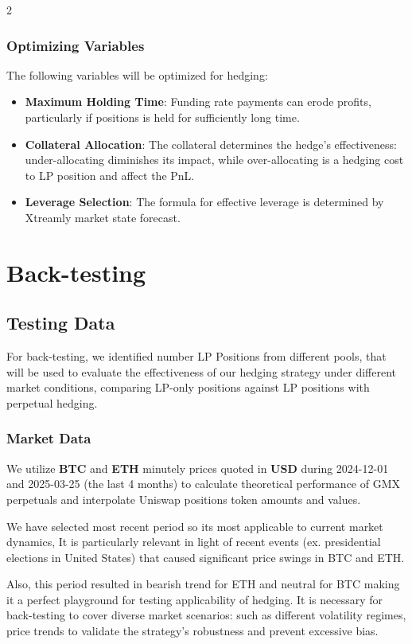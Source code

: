 \documentclass[10pt]{article}
\begin{document}
\begin{multicols}{2}
\subsubsection{Optimizing Variables}
The following variables will be optimized for hedging:
\begin{itemize}
	\item \textbf{Maximum Holding Time}: Funding rate payments can erode profits, particularly if positions is held for sufficiently long time.
	\item \textbf{Collateral Allocation}: The collateral determines the hedge’s effectiveness: under-allocating diminishes its impact, while over-allocating is a hedging cost to LP position and affect the PnL. 
	\item \textbf{Leverage Selection}: The formula for effective leverage is determined by Xtreamly market state forecast.
\end{itemize}

\bigskip

\section{Back-testing}

\subsection{Testing Data}
For back-testing, we identified number LP Positions from different pools, that will be used to evaluate the effectiveness of our hedging strategy under different market conditions, comparing LP-only positions against LP positions with perpetual hedging.

\subsubsection{Market Data}
We utilize \textbf{BTC} and \textbf{ETH} minutely prices quoted in \textbf{USD} during 2024-12-01 and 2025-03-25 (the last 4 months) to calculate theoretical performance of GMX perpetuals and interpolate Uniswap positions token amounts and values. 

\smallskip
We have selected most recent period so its most applicable to current market dynamics, It is particularly relevant in light of recent events (ex. presidential elections in United States) that caused significant price swings in BTC and ETH. 

\smallskip
Also, this period resulted in bearish trend for ETH and neutral for BTC making it a perfect playground for testing applicability of hedging. It is necessary for back-testing to cover diverse market scenarios: such as different volatility regimes, price trends to validate the strategy’s robustness and prevent excessive bias.


\end{multicols}
\end{document}
